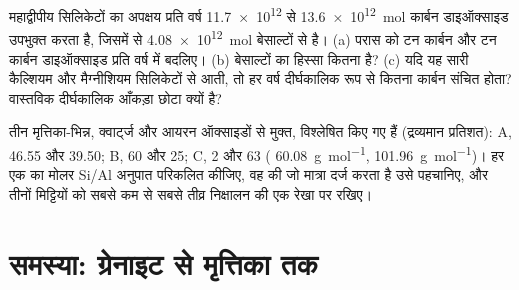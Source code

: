 \begin{exercise}[$\star\star\star$]
\label{exo:b1:weathering-clays:11}
महाद्वीपीय सिलिकेटों का अपक्षय प्रति वर्ष \num{11.7e12} से \qty{13.6e12}{mol} कार्बन डाइऑक्साइड उपभुक्त करता है, जिसमें से \qty{4.08e12}{mol} बेसाल्टों से है। (a) परास को टन कार्बन और टन कार्बन डाइऑक्साइड प्रति वर्ष में बदलिए। (b) बेसाल्टों का हिस्सा कितना है? (c) यदि यह सारी कैल्शियम और मैग्नीशियम सिलिकेटों से आती, तो हर वर्ष दीर्घकालिक रूप से कितना कार्बन संचित होता? वास्तविक दीर्घकालिक आँकड़ा छोटा क्यों है?
\end{exercise}

\begin{exercise}[$\star\star\star$]
\label{exo:b1:weathering-clays:12}
तीन मृत्तिका-भिन्न, क्वार्ट्ज और आयरन ऑक्साइडों से मुक्त, विश्लेषित किए गए हैं (द्रव्यमान प्रतिशत): A,  \num{46.55} और  \num{39.50}; B,  60 और  25; C,  2 और  63 ( \qty{60.08}{g.mol^{-1}},  \qty{101.96}{g.mol^{-1}})। हर एक का मोलर Si/Al अनुपात परिकलित कीजिए, वह  की जो मात्रा दर्ज करता है उसे पहचानिए, और तीनों मिट्टियों को सबसे कम से सबसे तीव्र निक्षालन की एक रेखा पर रखिए।
\end{exercise}

\section{समस्या: ग्रेनाइट से मृत्तिका तक}

